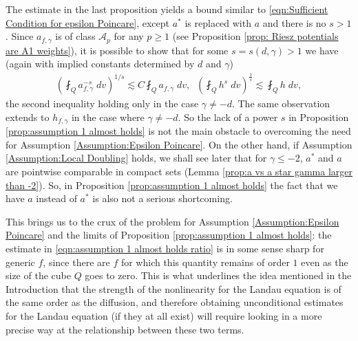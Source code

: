 \documentclass[12pt,american]{amsart}
\numberwithin{equation}{section}
\theoremstyle{plain}
\theoremstyle{definition}                  %
\def\astar{{a^*}}
\begin{document}
  The estimate in the last proposition yields a bound similar to \eqref{eqn:Sufficient Condition for epsilon Poincare}, except $\astar$ is replaced with $a$ and there is no $s>1$. Since $a_{f,\gamma}$ is of class $\mathcal{A}_p$  for any $p\geq 1$ (see Proposition \ref{prop: Riesz potentials are A1 weights}), it is possible to show that for some $s=s(d,\gamma)>1$ we have (again with implied constants determined by $d$ and $\gamma$)
  \begin{align*}
    \left(\fint_{Q} a_{f,\gamma}^{-s} \;dv \right)^{1/s} \lesssim C \fint_{Q} a_{f,\gamma} \;dv,\;\;    \left ( \fint_Q h^s\;dv \right )^{\frac{1}{s}}\lesssim \fint_Q h\;dv,
  \end{align*}
  the second inequality holding only in the case $\gamma\neq -d$. The same observation extends to $h_{f,\gamma}$ in the case where $\gamma \neq -d$. So the lack of a power $s$ in Proposition \ref{prop:assumption 1 almost holds} is not the main obstacle to overcoming the need for Assumption \ref{Assumption:Epsilon Poincare}. On the other hand, if Assumption \ref{Assumption:Local Doubling} holds, we shall see later that for $\gamma\leq -2$, $\astar$ and $a$ are pointwise comparable in compact sets (Lemma \ref{prop:a vs a star gamma larger than -2}).  So, in Proposition \ref{prop:assumption 1 almost holds} the fact that we have $a$ instead of $\astar$ is also not a serious shortcoming. 
  
  This brings us to the crux of the problem for Assumption \ref{Assumption:Epsilon Poincare} and the limits of Proposition \ref{prop:assumption 1 almost holds}: the estimate in \eqref{eqn:assumption 1 almost holds ratio} is in some sense sharp for generic $f$, since there are $f$ for which this quantity remains of order $1$ even as the size of the cube $Q$ goes to zero. This is what underlines the idea mentioned in the Introduction that the strength of the nonlinearity for the Landau equation is of the same order as the diffusion, and therefore obtaining unconditional estimates for the Landau equation (if they at all exist) will require looking in a more precise way at the relationship between these two terms. 
  
\end{document}
